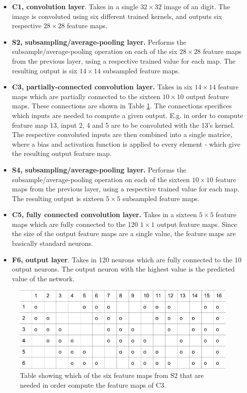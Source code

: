 \begin{itemize}
  \item \textbf{C1, convolution layer}. Takes in a single $ 32 \times 32 $ image of an digit. The image is convoluted using six different trained kernels, and outputs six respective $ 28 \times 28 $ feature maps. 
  \item \textbf{S2, subsampling/average-pooling layer.} Performs the subsample/average-pooling operation on each of the six $ 28 \times 28 $ feature maps from the previous layer, using a respective trained value for each map. The resulting output is six $ 14 \times 14 $ subsampled feature maps. 
  \item \textbf{C3, partially-connected convolution layer.} Takes in six $ 14 \times 14 $ feature maps which are partially connected to the sixteen $ 10 \times 10 $ output feature maps. These connections are shown in Table \ref{table_partial_connections}. The connections specifices which inputs are needed to compute a given output. E.g. in order to compute feature map 13, input 2, 4 and 5 are to be convoluted with the 13's kernel. The respective convoluted inputs are then combined into a single matrice, where a bias and activation function is applied to every element - which give the resulting output feature map. 
  \item \textbf{S4, subsampling/average-pooling layer.} Performs the subsample/average-pooling operation on each of the sixteen $ 10 \times 10 $ feature maps from the previous layer, using a respective trained value for each map. The resulting output is sixteen $ 5 \times 5 $ subsampled feature maps.
  \item \textbf{C5, fully connected convolution layer.} Takes in a sixteen $ 5 \times 5 $ feature maps which are fully connected to the 120 $ 1 \times 1 $ output feature maps. Since the size of the output feature maps are a single value, the feature maps are basically standard neurons. 
  \item \textbf{F6, output layer}. Takes in 120 neurons which are fully connected to the 10 output neurons. The output neuron with the highest value is the predicted value of the network. 
\end{itemize}


\begin{figure}[h!]
  \centering
      \includegraphics[width=1.0\textwidth]{Figures/Method/partial_connections}
    \caption[Feature map dependencies]{Table showing which of the six feature maps from S2 that are needed in order compute the feature maps of C3.}
    \label{table_partial_connections}
\end{figure}

